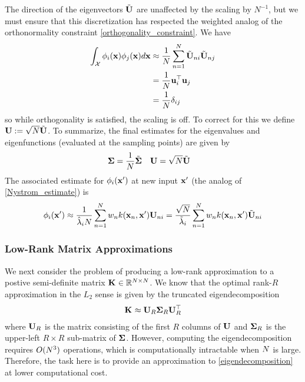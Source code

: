 \documentclass[12pt]{article}
\begin{document}
The direction of the eigenvectors $\tilde{\mathbf{U}}$ are unaffected by the scaling by $N^{-1}$, but we must ensure that this discretization has respected the weighted analog of the orthonormality constraint 
\ref{orthogonality_constraint}. We have 
\begin{align}
\int_{\mathcal{X}} \phi_i(\mathbf{x}) \phi_j(\mathbf{x}) d\mathbf{x} &\approx \frac{1}{N} \sum_{n = 1}^{N} \tilde{\mathbf{U}}_{n i} \tilde{\mathbf{U}}_{n j} \\
								   &= \frac{1}{N} \mathbf{u}_i^\top \mathbf{u}_j \\
								   &= \frac{1}{N} \delta_{ij}
\end{align}
so while orthogonality is satisfied, the scaling is off. To correct for this we define $\mathbf{U} := \sqrt{N} \tilde{\mathbf{U}}$. To summarize, the final estimates for the eigenvalues and 
eigenfunctions (evaluated at the sampling points) are given by 
\begin{align}
&\boldsymbol{\Sigma} = \frac{1}{N} \tilde{\boldsymbol{\Sigma}}  &&\mathbf{U} = \sqrt{N} \tilde{\mathbf{U}} \label{Nystrom_eigs_weighted}
\end{align}
The associated estimate for $\phi_i(\mathbf{x}^\prime)$ at new input $\mathbf{x}^\prime$ (the analog of \ref{Nystrom_estimate}) is 
\begin{align}
\phi_i(\mathbf{x}^\prime) \approx \frac{1}{\hat{\lambda}_i N} \sum_{n = 1}^{N} w_{n} k(\mathbf{x}_{n}, \mathbf{x}^\prime)  \mathbf{U}_{n i} = \frac{\sqrt{N}}{\tilde{\lambda}_i} \sum_{n = 1}^{N} w_{n} k(\mathbf{x}_{n}, \mathbf{x}^\prime)  \tilde{\mathbf{U}}_{n i} \label{Nystrom_estimate_weighted}
\end{align}

\subsubsection{Low-Rank Matrix Approximations}
We next consider the problem of producing a low-rank approximation to a postive semi-definite matrix $\mathbf{K}_{} \in \mathbb{R}^{N \times N}$. 
We know that the optimal rank-$R$ approximation in the 
$L_2$ sense is given by the truncated eigendecomposition 
\begin{align}
\mathbf{K}_{} \approx \mathbf{U}_{R} \boldsymbol{\Sigma}_R \mathbf{U}_R^\top \label{eigendecomposition}
\end{align}
where $\mathbf{U}_R$ is the matrix consisting of the first $R$ columns of $\mathbf{U}$ and $\boldsymbol{\Sigma}_R$ is the upper-left $R \times R$ sub-matrix of $\boldsymbol{\Sigma}$. However, computing the 
eigendecomposition requires $O(N^3)$ operations, which is computationally intractable when $N$ is large. Therefore, the task here is to provide an 
approximation to \ref{eigendecomposition} at lower computational cost. 
\end{document}
